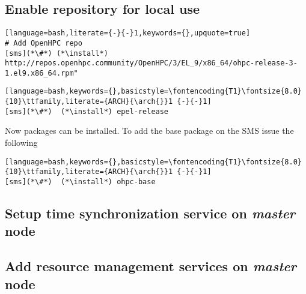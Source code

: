 \documentclass[letterpaper]{article}
\newcommand{\arch}{x86\_64}
\newcommand{\install}{dnf -y install}
\begin{document}
\subsection{Enable \OHPC{} repository for local use} \label{sec:enable_repo}


\begin{lstlisting}[language=bash,literate={-}{-}1,keywords={},upquote=true]
# Add OpenHPC repo 
[sms](*\#*) (*\install*) http://repos.openhpc.community/OpenHPC/3/EL_9/x86_64/ohpc-release-3-1.el9.x86_64.rpm"
\end{lstlisting}






\begin{lstlisting}[language=bash,keywords={},basicstyle=\fontencoding{T1}\fontsize{8.0}{10}\ttfamily,literate={ARCH}{\arch{}}1 {-}{-}1]
[sms](*\#*)  (*\install*) epel-release
\end{lstlisting}

Now \OHPC{} packages can be installed. To add the base package on the SMS
issue the following
\begin{lstlisting}[language=bash,keywords={},basicstyle=\fontencoding{T1}\fontsize{8.0}{10}\ttfamily,literate={ARCH}{\arch{}}1 {-}{-}1]
[sms](*\#*)  (*\install*) ohpc-base
\end{lstlisting}



\subsection{Setup time synchronization service on {\em master} node} \label{sec:add_ntp}


%


\subsection{Add resource management services on {\em master} node} \label{sec:add_rm}

\end{document}
